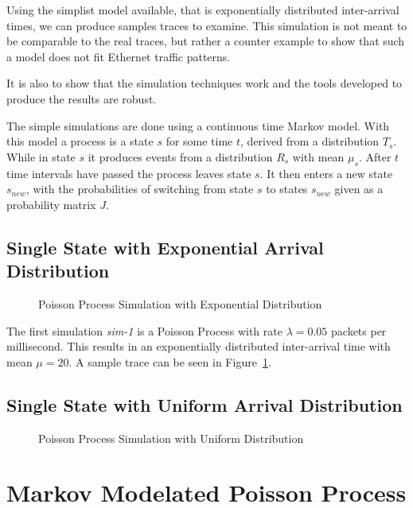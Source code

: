 Using the simplist model available, that is exponentially distributed
inter-arrival times, we can produce samples traces to examine.  This
simulation is not meant to be comparable to the real traces, but
rather a counter example to show that such a model does not fit
Ethernet traffic patterns.

It is also to show that the simulation techniques work and the tools
developed to produce the results are robust.

The simple simulations are done using a continuous time Markov model.
With this model a process is a state $s$ for some time $t$, derived
from a distribution $T_s$.  While in state $s$ it produces events from
a distribution $R_s$ with mean $\mu_s$.  After $t$ time intervals have
passed the process leaves state $s$.  It then enters a new state
$s_{new}$, with the probabilities of switching from state $s$ to
states $s_{new}$ given as a probability matrix $J$.

\subsection{Single State with Exponential Arrival Distribution}

\begin{figure}
\leavevmode
\epsfysize=3in
\caption{Poisson Process Simulation with Exponential Distribution}
\label{simple:sim.1.eps}
\end{figure}

The first simulation {\em sim-1} is a Poisson Process with rate
$\lambda = 0.05$ packets per millisecond.  This results in an
exponentially distributed inter-arrival time with mean $\mu = 20$.  A
sample trace can be seen in Figure~\ref{simple:sim.1.eps}.

\subsection{Single State with Uniform Arrival Distribution}

\begin{figure}
\leavevmode
\epsfysize=3in
\caption{Poisson Process Simulation with Uniform Distribution}
\label{simple:sim.2.eps}
\end{figure}

\section{Markov Modelated Poisson Process}


